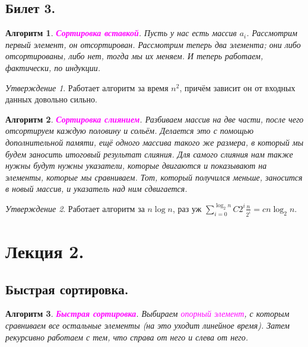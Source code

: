 \documentclass[a4paper]{article}
\theoremstyle{indented}
\newtheorem{alg}{Алгоритм}
\theoremstyle{definition}
\theoremstyle{remark}
\newtheorem{stat}{Утверждение}
\begin{document}
\subsection{Билет 3.}

\begin{alg}
    \textcolor{magenta}{\hypertarget{t-3}{\textbf{Сортировка вставкой}}}. Пусть у нас есть массив $a_i$. Рассмотрим первый элемент, он отсортирован. Рассмотрим теперь два элемента; они либо отсортированы, либо нет, тогда мы их меняем. И теперь работаем, фактически, по индукции. 
\end{alg}

\begin{stat}
    Работает алгоритм за время $n^2$, причём зависит он от входных данных довольно сильно.
\end{stat}

\begin{alg}
    \textcolor{magenta}{\hypertarget{t-4}{\textbf{Сортировка слиянием}}}. Разбиваем массив на две части, после чего отсортируем каждую половину и сольём. Делается это с помощью дополнительной памяти, ещё одного массива такого же размера, в который мы будем заносить итоговый результат слияния. Для самого слияния нам также нужны будут нужны указатели, которые двигаются и показывают на элементы, которые мы сравниваем. Тот, который получился меньше, заносится в новый массив, и указатель над ним сдвигается.
\end{alg}

\begin{stat}
    Работает алгоритм за $n\log n$, раз уж $\sum_{i=0}^{\log_2 n} C 2^i \frac{n}{2^i}=c n \log_2 n$. 
\end{stat}

\section{Лекция 2.}

\subsection{Быстрая сортировка.}

\begin{alg}
    \textcolor{magenta}{\hypertarget{r1}{\textbf{Быстрая сортировка}}}. Выбираем \textcolor{magenta}{\hypertarget{d1}{\textit{опорный элемент}}}, с которым сравниваем все остальные элементы (на это уходит линейное время). Затем рекурсивно работаем с тем, что справа от него и слева от него.
\end{alg} \ 
\end{document}

